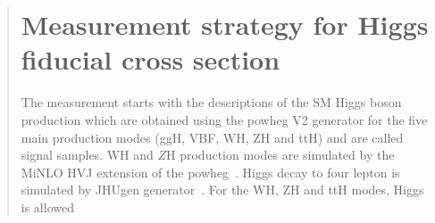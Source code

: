 \begin{abstract}
\section{Measurement strategy for Higgs fiducial cross section} \label{chinese_abstract_strategy}
The measurement starts with the descriptions of the SM Higgs boson production which are obtained using the 
{\sc powheg V2}  generator for the five main production modes (ggH, VBF, WH, ZH and ttH) and are called signal samples. 
WH and $Z$H production modes are simulated by the {\sc MiNLO HVJ} extension of the {\sc powheg}~\cite{Luisoni:2013kna}. 
Higgs decay to four lepton is simulated by {\sc JHUgen} generator~\cite{Gao:2010qx}. For the WH, ZH and ttH modes, Higgs is allowed

\end{abstract}
